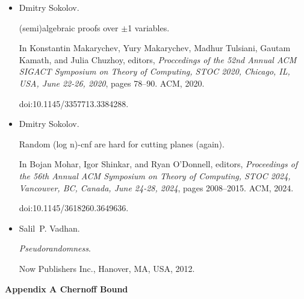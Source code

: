 \documentclass[10pt,a4paper]{article}
\begin{document}
\begin{itemize}
Nathan Segerlind, Samuel R. Buss, and Russell Impagliazzo.


A switching lemma for small restrictions and lower bounds for k-dnf
resolution.


\emph{SIAM J. Comput.}, 33(5):1171–1200, 2004.


doi:10.1137/S0097539703428555.





\item[] 
[36]

Dmitry Sokolov.


(semi)algebraic proofs over $\pm$1 variables.


In Konstantin Makarychev, Yury Makarychev, Madhur Tulsiani, Gautam
Kamath, and Julia Chuzhoy, editors, \emph{Proccedings of the 52nd Annual ACM
SIGACT Symposium on Theory of Computing, STOC 2020, Chicago, IL, USA,
June 22-26, 2020}, pages 78–90. ACM, 2020.


doi:10.1145/3357713.3384288.





\item[] 
[37]

Dmitry Sokolov.


Random (log n)-cnf are hard for cutting planes (again).


In Bojan Mohar, Igor Shinkar, and Ryan O’Donnell, editors, \emph{Proceedings of the 56th Annual ACM Symposium on Theory of Computing, STOC
2024, Vancouver, BC, Canada, June 24-28, 2024}, pages 2008–2015. ACM,
2024.


doi:10.1145/3618260.3649636.





\item[] 
[38]

Salil P. Vadhan.


\emph{Pseudorandomness}.


Now Publishers Inc., Hanover, MA, USA, 2012.





\end{itemize}




\par\medskip\noindent\textbf{
Appendix A Chernoff Bound}\par



\end{document}
